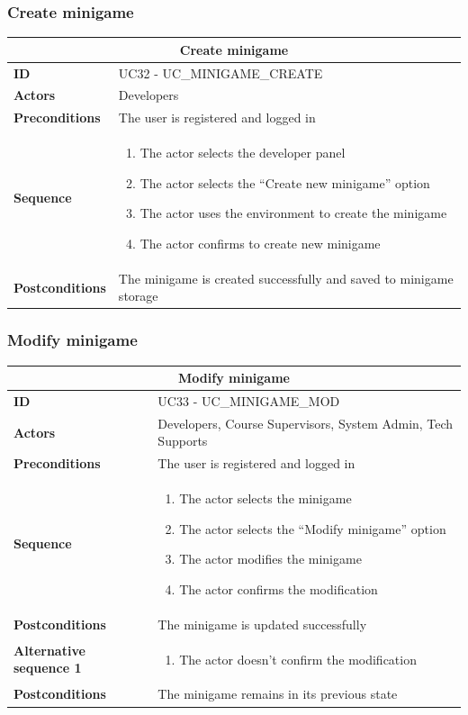 \subsubsection{Create minigame}
\begin{tabular}{|m{2.5cm}|m{8cm}|}
	\hline
	\multicolumn{2}{|c|}{Create minigame} \\
	\hline
	\textbf{ID} & UC32 - UC\_MINIGAME\_CREATE \\
	\hline
	\textbf{Actors} & Developers \\
	\hline
	\textbf{Preconditions} & The user is registered and logged in \\
	\hline
	\textbf{Sequence} & 
	\begin{enumerate}
		\item The actor selects the developer panel
		\item The actor selects the “Create new minigame” option
		\item The actor uses the environment to create the minigame
		\item The actor confirms to create new minigame
	\end{enumerate} \\
	\hline
	\textbf{Postconditions} & The minigame is created successfully and saved to minigame storage \\
	\hline
\end{tabular}

\subsubsection{Modify minigame}
\begin{tabular}{|m{2.5cm}|m{8cm}|}
	\hline
	\multicolumn{2}{|c|}{Modify minigame} \\
	\hline
	\textbf{ID} & UC33 - UC\_MINIGAME\_MOD \\
	\hline
	\textbf{Actors} & Developers, Course Supervisors, System Admin, Tech Supports \\
	\hline
	\textbf{Preconditions} & The user is registered and logged in \\
	\hline
	\textbf{Sequence} & 
	\begin{enumerate}
		\item The actor selects the minigame
		\item The actor selects the “Modify minigame” option
		\item The actor modifies the minigame
		\item The actor confirms the modification
	\end{enumerate} \\
	\hline
	\textbf{Postconditions} & The minigame is updated successfully \\
	\hline
	
	\textbf{Alternative sequence 1} & 
	\begin{enumerate}
		\item The actor doesn’t confirm the modification
	\end{enumerate} \\
	\hline
	\textbf{Postconditions} & The minigame remains in its previous state \\
	\hline
\end{tabular}

